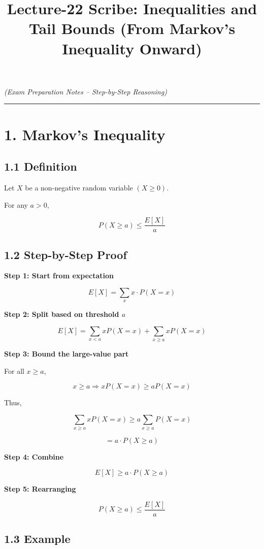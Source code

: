 \documentclass[12pt]{article}
\title{Lecture-22 Scribe: Inequalities and Tail Bounds (From Markov’s Inequality Onward)}
\date{}
\begin{document}
\maketitle

\textit{(Exam Preparation Notes – Step-by-Step Reasoning)}

\hrule

\section*{1. Markov’s Inequality}

\subsection*{1.1 Definition}

Let $X$ be a non-negative random variable $(X \ge 0)$.

For any $a > 0$,

\[
P (X \ge a) \le \frac{E[X]}{a}
\]

\subsection*{1.2 Step-by-Step Proof}

\textbf{Step 1: Start from expectation}

\[
E[X] = \sum_x x \cdot P (X = x)
\]

\textbf{Step 2: Split based on threshold $a$}

\[
E[X] = \sum_{x<a} xP (X = x) + \sum_{x \ge a} xP (X = x)
\]

\textbf{Step 3: Bound the large-value part}

For all $x \ge a$,

\[
x \ge a \Rightarrow xP (X = x) \ge aP (X = x)
\]

Thus,

\[
\sum_{x \ge a} xP (X = x) \ge a \sum_{x \ge a} P (X = x)
\]

\[
= a \cdot P (X \ge a)
\]

\textbf{Step 4: Combine}

\[
E[X] \ge a \cdot P (X \ge a)
\]

\textbf{Step 5: Rearranging}

\[
P (X \ge a) \le \frac{E[X]}{a}
\]

\subsection*{1.3 Example}
\end{document}
